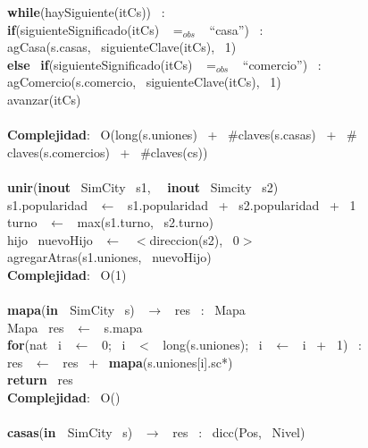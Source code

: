 \begin{Algoritmos}
\indent \textbf{while}(haySiguiente(itCs)) \ :\\
\indent \indent \textbf{if}(siguienteSignificado(itCs) \ $=_{obs}$ \ ``casa'') \ :\\
\indent \indent \indent agCasa(s.casas, \ siguienteClave(itCs), \ 1)\\
\indent \indent \textbf{else} \ \textbf{if}(siguienteSignificado(itCs) \ $=_{obs}$ \ ``comercio'') \ :\\
\indent \indent \indent agComercio(s.comercio, \ siguienteClave(itCs), \ 1)\\
\indent \indent avanzar(itCs)\\
\\
\textbf{Complejidad}: \ O(long(s.uniones) \ + \ $ \# $claves(s.casas) \ + \ $ \# $claves(s.comercios) \ + \ $ \# $claves(cs))\\
\noindent\makebox[\linewidth]{\rule{\textwidth}{0.4pt}}
\\
\noindent\makebox[\linewidth]{\rule{\textwidth}{0.4pt}}
\textbf{unir}(\textbf{inout} \ SimCity \ s1, \  \ \textbf{inout} \ Simcity \ s2)\\
\indent s1.popularidad \ $\leftarrow$ \ s1.popularidad \ + \ s2.popularidad \ + \ 1\\
\indent turno \ $\leftarrow$ \ max(s1.turno, \ s2.turno)\\
\indent hijo \ nuevoHijo \ $\leftarrow$ \ $<$direccion(s2), \ 0$>$\\
\indent agregarAtras(s1.uniones, \ nuevoHijo)\\
\textbf{Complejidad}: \ O(1)\\
\noindent\makebox[\linewidth]{\rule{\textwidth}{0.4pt}}
\\
\noindent\makebox[\linewidth]{\rule{\textwidth}{0.4pt}}
\textbf{mapa}(\textbf{in \ }SimCity \ s) \ $\rightarrow $ \ res \ : \ Mapa \ \\
\indent Mapa \ res \ $\leftarrow$ \ s.mapa\\
\indent \textbf{for}(nat \ i \ $\leftarrow$ \ 0; \ i \ $<$ \ long(s.uniones); \ i \ $\leftarrow$ \ i \ + \ 1) \ : \ \\
\indent \indent res \ $\leftarrow$ \ res \ + \ \textbf{mapa}(s.uniones[i].sc*)\\
\indent \textbf{return} \ res\\
\textbf{Complejidad}: \ O()\\
\noindent\makebox[\linewidth]{\rule{\textwidth}{0.4pt}}
\\
\noindent\makebox[\linewidth]{\rule{\textwidth}{0.4pt}}
\textbf{casas}(\textbf{in \ }SimCity \ s) \ $\rightarrow $ \ res \ : \ dicc(Pos, \ Nivel)\\

\end{Algoritmos}
